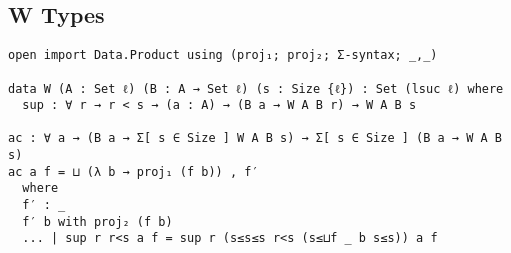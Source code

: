 \subsection{W Types} \label{app:mechanization:agda:W}

\begin{singlespace}
\begin{verbatim}
open import Data.Product using (proj₁; proj₂; Σ-syntax; _,_)

data W (A : Set ℓ) (B : A → Set ℓ) (s : Size {ℓ}) : Set (lsuc ℓ) where
  sup : ∀ r → r < s → (a : A) → (B a → W A B r) → W A B s

ac : ∀ a → (B a → Σ[ s ∈ Size ] W A B s) → Σ[ s ∈ Size ] (B a → W A B s)
ac a f = ⊔ (λ b → proj₁ (f b)) , f′
  where
  f′ : _
  f′ b with proj₂ (f b)
  ... | sup r r<s a f = sup r (s≤s≤s r<s (s≤⊔f _ b s≤s)) a f
\end{verbatim}
\end{singlespace}
